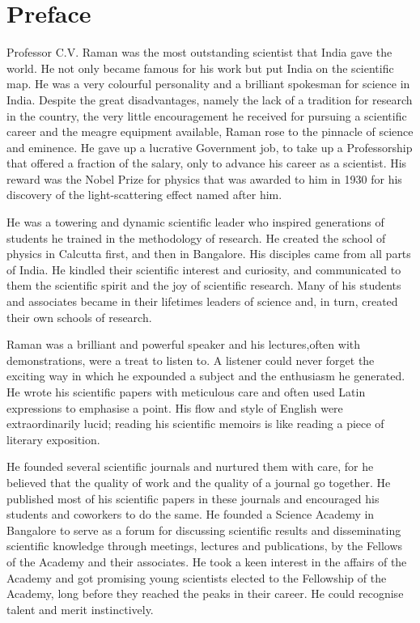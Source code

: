 \chapter*{Preface}


Professor C.V\@. Raman was the most outstanding scientist that India gave the world. He not only became famous for his
work but put India on the scientific map. He was a very colourful personality and a brilliant spokesman for science in India. Despite the great disadvantages, namely the lack of a tradition for research in the country, the very little encouragement he received for pursuing a scientific career and the meagre equipment available, Raman rose to the pinnacle of science and eminence. He gave up a lucrative Government job, to take up a Professorship that offered a fraction of the salary, only to advance his career as a scientist. His reward was the Nobel Prize for physics that was awarded to him in 1930 for his discovery of the light-scattering effect named after him.

He was a towering and dynamic scientific leader who inspired generations of students he trained in the methodology of research. He created the school of physics in Calcutta first, and then in Bangalore. His disciples came from all parts of India. He kindled their scientific interest and curiosity, and communicated to them the scientific spirit and the joy of scientific research. Many of his students and associates became in their lifetimes leaders of science and, in turn, created their own schools of research.

Raman was a brilliant and powerful speaker and his lectures,\break often with demonstrations, were a treat to listen to. A listener could never forget the exciting way in which he expounded a subject and the enthusiasm he generated. He wrote his scientific  papers with meticulous care and often used Latin expressions to emphasise a point. His flow and style of English were extraordinarily lucid; reading his scientific memoirs is like reading a piece of literary exposition.

He founded several scientific journals and nurtured them with care, for he believed that the quality of work and the quality of a journal go together. He published most of his scientific papers in these journals and encouraged his students and coworkers to do the same. He founded a Science Academy in Bangalore to serve as a forum for discussing scientific results and disseminating scientific knowledge through meetings, lectures and publications, by the Fellows of the Academy and their associates. He took a keen interest in the affairs of the Academy and got promising young scientists elected to the Fellowship of the Academy, long before they reached the peaks in their career. He could recognise talent and merit instinctively.

